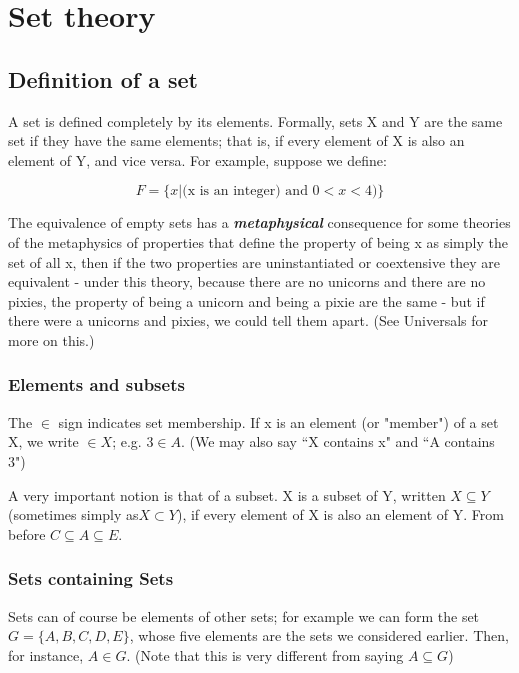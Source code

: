\documentclass[]{report}
\begin{document}
\chapter{Set theory}

\section{Definition of a set}

A set is defined completely by its elements. Formally, sets X and Y are the same set if they have the same elements; that is, if every element of X is also an element of Y, and vice versa. For example, suppose we define:

\[ F = \{x | \mbox{(x is an integer)} \mbox{ and } 0 < x < 4)\}  \]

The equivalence of empty sets has a \textbf{\textit{metaphysical}} consequence for some theories of the metaphysics of properties that define the property of being x as simply the set of all x, then if the two properties are uninstantiated or coextensive they are equivalent - under this theory, because there are no unicorns and there are no pixies, the property of being a unicorn and being a pixie are the same - but if there were a unicorns and pixies, we could tell them apart. (See Universals for more on this.)

\subsection{Elements and subsets}

The $\in$  sign indicates set membership. If x is an element (or "member") of a set X, we write $ \in X$; e.g. $3\in A$. (We may also say ``X contains x" and ``A contains 3")

A very important notion is that of a subset. X is a subset of Y, written $X \subseteq Y$ (sometimes simply as$X \subset Y$), if every element of X is also an element of Y. From before $C\subseteq A \subseteq E$.
\subsection{Sets containing Sets}


Sets can of course be elements of other sets; for example we can form the set $G = \{A,B,C,D,E\}$, whose five elements are the sets we considered earlier. Then, for instance, $A\in G$. (Note that this is very different from saying $A\subseteq G$)
\end{document}
